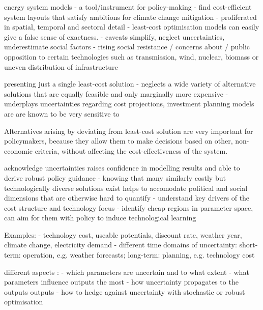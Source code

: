 
energy system models 
- a tool/instrument for policy-making
- find cost-efficient system layouts that satisfy ambitions for climate change mitigation
- proliferated in spatial, temporal and sectoral detail
- least-cost optimisation models can easily give a false sense of exactness.
- caveats simplify, neglect uncertainties, underestimate social factors
- rising social resistance / concerns about / public opposition to certain technologies such as transmission, wind, nuclear, biomass \cite{mccollum_energy_2020} or uneven distribution of infrastructure

presenting just a single least-cost solution
- neglects a wide variety of alternative solutions that are equally feasible and only marginally more expensive \cite{nearoptimal,lombardi_policy_2020,sasse_distributional_2019,trondle_trade-offs_2020}
- underplays uncertainties regarding cost projections, investment planning models are are known to be very sensitive to \cite{Pfenninger2014,yue_review_2018,pye_assessing_2018,pye_modelling_2020} 


Alternatives arising by deviating from least-cost solution are very important for policymakers,
because they allow them to make decisions based on other, non-economic criteria,
without affecting the cost-effectiveness of the system.

acknowledge uncertainties raises confidence in modelling results and able to derive robust policy guidance
- knowing that many similarly costly but technologically diverse solutions exist helps to accomodate political and social dimensions that are otherwise hard to quantify
- understand key drivers of the cost structure and technology focus \cite{usher_value_2015,moret_characterization_2017}
- identify cheap regions in parameter space, can aim for them with policy to induce technological learning


Examples:
- technology cost, useable potentials, discount rate, weather year, climate change, electricity demand
- different time domains of uncertainty: short-term: operation, e.g. weather forecasts; long-term: planning, e.g. technology cost

different aspects \cite{usher_value_2016}:
- which parameters are uncertain and to what extent
- what parameters influence outputs the most
- how uncertainty propagates to the outputs outputs
- how to hedge against uncertainty with stochastic or robust optimisation

